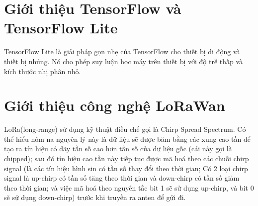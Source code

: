 
\label{chap:ontology}
\section{Giới thiệu TensorFlow và TensorFlow Lite}
TensorFlow Lite là giải pháp gọn nhẹ của TensorFlow cho thiết bị di động và thiết bị nhúng.
Nó cho phép suy luận học máy trên thiết bị với độ trễ thấp và kích thước nhị phân nhỏ.




\section{Giới thiệu công nghệ LoRaWan}
LoRa(long-range) sử dụng kỹ thuật điều chế gọi là Chirp Spread Spectrum.
Có thể hiểu nôm na nguyên lý này là dữ liệu sẽ được băm bằng các xung cao tần để tạo ra tín hiệu có dãy tần số cao hơn tần số của dữ liệu gốc (cái này gọi là chipped); sau đó tín hiệu cao tần này tiếp tục được mã hoá theo các chuỗi chirp signal (là các tín hiệu hình sin có tần số thay đổi theo thời gian; 
Có 2 loại chirp signal là up-chirp có tần số tăng theo thời gian và down-chirp có tần số giảm theo thời gian; và việc mã hoá theo nguyên tắc bit 1 sẽ sử dụng up-chirp, và bit 0 sẽ sử dụng down-chirp) trước khi truyền ra anten để gửi đi.

